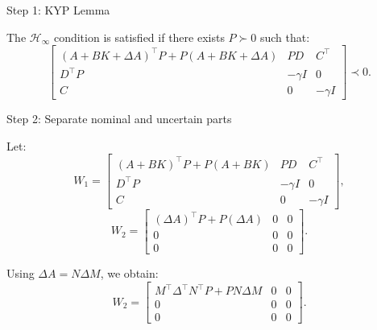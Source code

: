 \documentclass{beamer}
\begin{document}
\begin{frame}{Step 1: KYP Lemma}
	\begin{flushleft}
		
	The $\mathcal{H}_\infty$ condition is satisfied if there exists $P \succ 0$ such that:
	\[
	\begin{bmatrix}
		(A + BK + \Delta A)^\top P + P(A + BK + \Delta A) & PD & C^\top \\
		D^\top P & -\gamma I & 0 \\
		C & 0 & -\gamma I
	\end{bmatrix} \prec 0.
	\]
	
		
	\end{flushleft}
\end{frame}




\begin{frame}{Step 2: Separate nominal and uncertain parts}
	\begin{flushleft}
		
		
		Let:
		\[
		W_1 =
		\begin{bmatrix}
			(A + BK)^\top P + P(A + BK) & PD & C^\top \\
			D^\top P & -\gamma I & 0 \\
			C & 0 & -\gamma I
		\end{bmatrix},
		\]
		\[
		W_2 =
		\begin{bmatrix}
			(\Delta A)^\top P + P(\Delta A) & 0 & 0 \\
			0 & 0 & 0 \\
			0 & 0 & 0
		\end{bmatrix}.
		\]
		
		Using $\Delta A = N \Delta M$, we obtain:
		\[
		W_2 =
		\begin{bmatrix}
			M^\top \Delta^\top N^\top P + PN \Delta M & 0 & 0 \\
			0 & 0 & 0 \\
			0 & 0 & 0
		\end{bmatrix}.
		\]
		
	\end{flushleft}
\end{frame}
\end{document}
